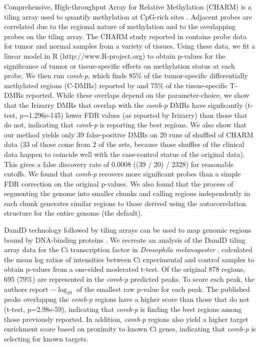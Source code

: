 \documentclass{bioinfo}
\begin{document}
\begin{methods}
Comprehensive, High-throughput Array for Relative Methylation (CHARM)
is a tiling array used to quantify methylation at CpG-rich sites
\citep{Irizarry2008}.  Adjacent probes are correlated
due to the regional nature of methylation and to the overlapping
probes on the tiling array.  The CHARM study reported in
\cite{Irizarry2009} contains probe data for tumor and normal samples
from a variety of tissues. Using these data, we fit a linear model in R
(http://www.R-project.org) to
obtain p-values for the significance of tumor or tissue-specific
effects on methylation status at each probe.  We then run
\textit{comb-p}, which finds 85\% of the tumor-specific differentially
methylated regions (C-DMRs) reported by \cite{Irizarry2009} and 75\% of
the tissue-specific T-DMRs reported.  While these overlaps depend on
the parameter-choice, we show that the Irizarry DMRs that overlap
with the \textit{comb-p} DMRs have signficantly (t-test,
p=1.296e-145) lower FDR values (as reported by Irizarry) than those
that do not, indicating that \textit{comb-p} is reporting the best regions.
We also show that our method yields only 39 false-positive DMRs on 20
runs of shuffled of CHARM data (33 of those come from 2 of the sets,
because those shuffles of the clinical data happen to coincide well
with the case-control status of the original data). This gives a false
discovery rate of 0.0008  ((39 / 20) / 2328) for reasonable cutoffs.
We found that \textit{comb-p} recovers more significant
probes than a simple FDR correction on the original p-values.
We also found that the process of segmenting the genome into smaller chunks and
calling regions independently in each chunk generates similar regions to those
derived using the autocorrelation structure for the entire genome (the default).


DamID technology followed by tiling arrays can be used to map genomic
regions bound by DNA-binding proteins \citep{Steensel2001}.  We
recreate an analysis of the DamID tiling array data for the Ci
transcription factor in {\it Drosophila melanogaster} \citep{Biehs}.
\cite{Kechris2010} calculated the
mean log ratios of intensities between Ci experimental and control
samples to obtain p-values from a one-sided moderated t-test.
Of the original 878 regions, 695 (79\%) are
represented in the \textit{comb-p} predicted peaks.  To score each
peak, the authors report $-\log_{10}$ of the smallest raw p-value for
each peak. The published peaks overlappng the \textit{comb-p} regions
have a higher score than those that do not (t-test, p=2.98e-59),
indicating that \textit{comb-p}
is finding the best regions among those previously reported.
In addition, \textit{comb-p} regions also yield a higher target enrichment
score based on proximity to known Ci genes, indicating that \textit{comb-p}
is selecting for known targets.


\end{methods}
\end{document}
